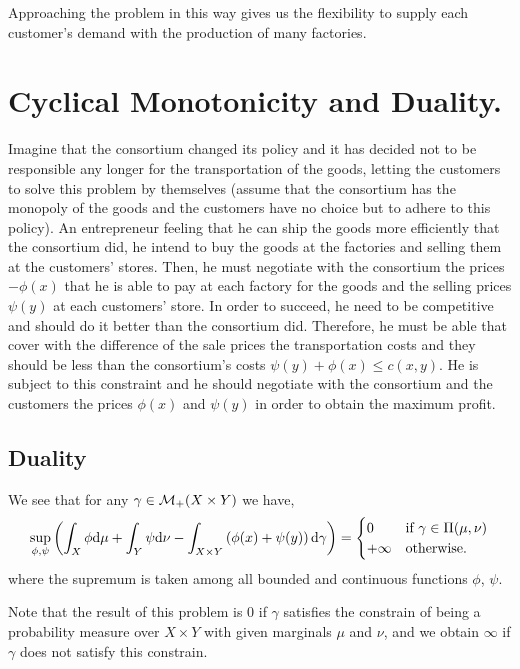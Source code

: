 Approaching the problem in this way gives us the flexibility to supply each customer's demand with the production of many factories.  

\section{Cyclical Monotonicity and Duality.}

Imagine that the consortium changed its policy and it has decided not to be responsible any longer for the transportation of the goods, letting the customers to solve this problem by themselves (assume that the consortium has the monopoly of the goods and the customers have no choice but to adhere to this policy). An entrepreneur feeling that he can ship the goods more efficiently that the consortium did, he intend to buy the goods at the factories and selling them at the customers' stores. Then, he must negotiate with the consortium the prices $-\phi(x)$ that he is able to pay at each factory for the goods and the selling prices $\psi(y)$ at each customers' store. In order to succeed, he need to be competitive and should do it better than the consortium did. Therefore, he must be able that cover with the difference of the sale prices the transportation costs and they should be less than the consortium's costs $\psi(y)+\phi(x)\leq c(x,y)$. He is subject to this constraint and he should negotiate with the consortium and the customers the prices $\phi(x)$ and $\psi(y)$ in order to obtain the maximum profit.

\subsection{Duality}
We see that for any $\gamma \in \mathcal{M}_+(X\times Y)$ we have,
\begin{equation}
\sup_{\phi, \psi} \left( \int_X \phi\mathrm{d}\mu +\int_Y\psi\mathrm{d}\nu-\int_{X\times Y}\left( \phi(x)+\psi(y) \right)\mathrm{d} \gamma \right) = \begin{cases}
0 & \text{if } \gamma \in \Pi(\mu, \nu) \\
+\infty & \text{otherwise}.	
\end{cases}\label{eq: Constrain indicator}
\end{equation}
where the supremum is taken among all bounded and continuous functions $\phi$, $\psi$. 

Note that the result of this problem is $0$ if $\gamma$ satisfies the constrain of being a probability measure over $X\times Y$ with given marginals $\mu$ and $\nu$, and we obtain $\infty$ if $\gamma$ does not satisfy this constrain.

